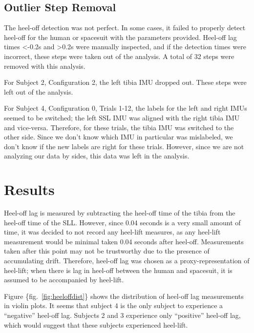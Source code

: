 \documentclass[defaultstyle,11pt]{comps}
\begin{document}
\hypertarget{outlier-step-removal}{%
\subsection{Outlier Step Removal}\label{outlier-step-removal}}

The heel-off detection was not perfect.
In some cases, it failed to properly detect heel-off for the human or spacesuit with the parameters provided.
Heel-off lag times \textless-0.2s and \textgreater0.2s were manually inspected, and if the detection times were incorrect, these steps were taken out of the analysis. A total of 32 steps were removed with this analysis.

For Subject 2, Configuration 2, the left tibia IMU dropped out. These steps were left out of the analysis.

For Subject 4, Configuration 0, Trials 1-12, the labels for the left and right IMUs seemed to be switched; the left SSL IMU was aligned with the right tibia IMU and vice-versa. Therefore, for these trials, the tibia IMU was switched to the other side. Since we don't know which IMU in particular was mislabeled, we don't know if the new labels are right for these trials. However, since we are not analyzing our data by sides, this data was left in the analysis.

\hypertarget{results}{%
\section{Results}\label{results}}

Heel-off lag is measured by subtracting the heel-off time of the tibia from the heel-off time of the SLL.
However, since 0.04 seconds is a very small amount of time, it was decided to not record any heel-lift measures, as any heel-lift measurement would be minimal taken 0.04 seconds after heel-off. Measurements taken after this point may not be trustworthy due to the presence of accumulating drift. Therefore, heel-off lag was chosen as a proxy-representation of heel-lift; when there is lag in heel-off between the human and spacesuit, it is assumed to be accompanied by heel-lift.

Figure \{fig.~\ref{fig:heeloffdist}\} shows the distribution of heel-off lag measurements in violin plots.
It seems that subject 4 is the only subject to experience a ``negative'' heel-off lag.
Subjects 2 and 3 experience only ``positive'' heel-off lag, which would suggest that these subjects experienced heel-lift.
\end{document}
